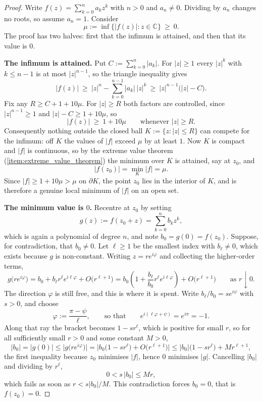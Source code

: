 \begin{proof}
Write $f(z) = \sum_{k=0}^n a_kz^k$ with $n > 0$ and $a_n \neq 0$. Dividing by $a_n$ changes no
roots, so assume $a_n = 1$. Consider
\[\mu := \inf\big\{\lvert f(z)\rvert : z \in \mathbb{C}\big\} \ \geq\ 0.\]
The proof has two halves: first that the infimum is attained, and then that its value is $0$.

\textbf{The infimum is attained.} Put $C := \sum_{k=0}^{n}\lvert a_k\rvert$. For
$\lvert z\rvert \geq 1$ every $\lvert z\rvert^k$ with $k \leq n-1$ is at most
$\lvert z\rvert^{n-1}$, so the triangle inequality gives
\[\lvert f(z)\rvert \ \geq\ \lvert z\rvert^n - \sum_{k=0}^{n-1}\lvert a_k\rvert\,\lvert z\rvert^k
  \ \geq\ \lvert z\rvert^{n-1}\big(\lvert z\rvert - C\big).\]
Fix any $R \geq C + 1 + 10\mu$. For $\lvert z\rvert \geq R$ both factors are controlled, since
$\lvert z\rvert^{n-1} \geq 1$ and $\lvert z\rvert - C \geq 1 + 10\mu$, so
\[\lvert f(z)\rvert \ \geq\ 1 + 10\mu \qquad\text{whenever } \lvert z\rvert \geq R.\]
Consequently nothing outside the closed ball $K := \{z : \lvert z\rvert \leq R\}$ can compete for
the infimum: off $K$ the values of $\lvert f\rvert$ exceed $\mu$ by at least $1$. Now $K$ is
compact and $\lvert f\rvert$ is continuous, so by the extreme value theorem
(\cref{item:extreme_value_theorem}) the minimum over $K$ is attained, say at $z_0$, and
\[\lvert f(z_0)\rvert = \min_K \lvert f\rvert = \mu.\]
Since $\lvert f\rvert \geq 1 + 10\mu > \mu$ on $\partial K$, the point $z_0$ lies in the interior
of $K$, and is therefore a genuine local minimum of $\lvert f\rvert$ on an open set.

\textbf{The minimum value is $0$.} Recentre at $z_0$ by setting
\[g(z) := f(z_0 + z) = \sum_{k=0}^{n} b_kz^k,\]
which is again a polynomial of degree $n$, and note $b_0 = g(0) = f(z_0)$. Suppose, for
contradiction, that $b_0 \neq 0$. Let $\ell \geq 1$ be the smallest index with $b_\ell \neq 0$,
which exists because $g$ is non-constant. Writing $z = re^{i\varphi}$ and collecting the
higher-order terms,
\[g\big(re^{i\varphi}\big) = b_0 + b_\ell r^\ell e^{i\ell\varphi} + O\big(r^{\ell+1}\big)
  = b_0\left(1 + \frac{b_\ell}{b_0}r^\ell e^{i\ell\varphi}\right) + O\big(r^{\ell+1}\big)
  \qquad\text{as } r \downarrow 0.\]
The direction $\varphi$ is still free, and this is where it is spent. Write
$b_\ell/b_0 = se^{i\psi}$ with $s > 0$, and choose
\[\varphi := \frac{\pi - \psi}{\ell}, \qquad\text{so that}\qquad
  e^{i(\ell\varphi + \psi)} = e^{i\pi} = -1.\]
Along that ray the bracket becomes $1 - sr^\ell$, which is positive for small $r$, so for all
sufficiently small $r > 0$ and some constant $M > 0$,
\[\lvert b_0\rvert = \lvert g(0)\rvert \leq \big\lvert g\big(re^{i\varphi}\big)\big\rvert
  = \Big\lvert b_0\big(1 - sr^\ell\big) + O\big(r^{\ell+1}\big)\Big\rvert
  \leq \lvert b_0\rvert\big(1 - sr^\ell\big) + Mr^{\ell+1},\]
the first inequality because $z_0$ minimises $\lvert f\rvert$, hence $0$ minimises $\lvert g
\rvert$. Cancelling $\lvert b_0\rvert$ and dividing by $r^\ell$,
\[0 < s\,\lvert b_0\rvert \leq Mr,\]
which fails as soon as $r < s\lvert b_0\rvert/M$. This contradiction forces $b_0 = 0$, that is
$f(z_0) = 0$.
\end{proof}

